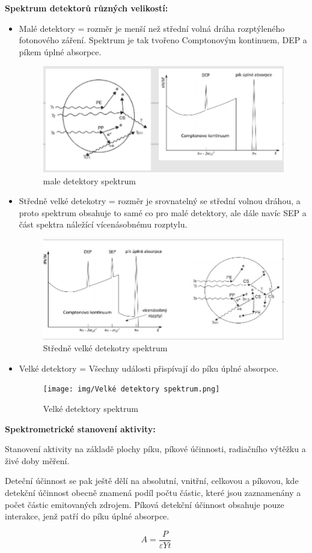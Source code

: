 \textbf{Spektrum detektorů různých velikostí:}

\begin{itemize}
    \item Malé detektory = rozměr je menší než střední volná dráha rozptýleného fotonového záření. Spektrum je tak tvořeno Comptonovým kontinuem, DEP a píkem úplné absorpce.

\begin{figure}[H]
    \centering
    \includegraphics[width=0.75\linewidth]{img/male detektory spektrum.png}
    \caption{male detektory spektrum}
\end{figure}
    
    \item Středně velké detekotry = rozměr je srovnatelný se střední volnou dráhou, a proto spektrum obsahuje to samé co pro malé detektory, ale dále navíc SEP a část spektra náležící vícenásobnému rozptylu.

\begin{figure}[H]
    \centering
    \includegraphics[width=0.75\linewidth]{img/Středně velké detekotry spektrum.png}
    \caption{Středně velké detekotry spektrum}
\end{figure}
    
    \item Velké detektory = Všechny události přispívají do píku úplné absorpce.

\begin{figure}[H]
    \centering
    \texttt{[image: img/Velké detektory spektrum.png]}
    \caption{Velké detektory spektrum}
\end{figure}
    
\end{itemize}

\textbf{Spektrometrické stanovení aktivity:}

Stanovení aktivity na základě plochy píku, píkové účinnosti, radiačního výtěžku a živé doby měření. 

Deteční účinnost se pak ještě dělí na absolutní, vnitřní, celkovou a píkovou, kde detekční účinnost obecně znamená podíl počtu částic, které jsou zaznamenány a počet částic emitovaných zdrojem. Píková detekční účinnost obsahuje pouze interakce, jenž patří do píku úplné absorpce.

\begin{equation}
    A = \frac{P}{\varepsilon Y t}
\end{equation}